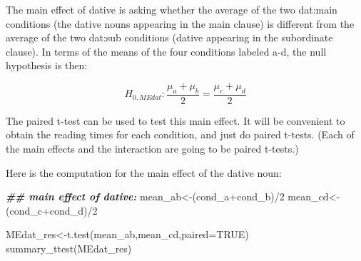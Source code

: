 \documentclass[
  12pt,
]{krantz}
\newenvironment{Shaded}{\begin{snugshade}}{\end{snugshade}}
\newcommand{\AttributeTok}[1]{\textcolor[rgb]{0.77,0.63,0.00}{#1}}
\newcommand{\ConstantTok}[1]{\textcolor[rgb]{0.00,0.00,0.00}{#1}}
\newcommand{\DecValTok}[1]{\textcolor[rgb]{0.00,0.00,0.81}{#1}}
\newcommand{\DocumentationTok}[1]{\textcolor[rgb]{0.56,0.35,0.01}{\textbf{\textit{#1}}}}
\newcommand{\FunctionTok}[1]{\textcolor[rgb]{0.00,0.00,0.00}{#1}}
\newcommand{\NormalTok}[1]{#1}
\newcommand{\OtherTok}[1]{\textcolor[rgb]{0.56,0.35,0.01}{#1}}
\newcommand{\SpecialCharTok}[1]{\textcolor[rgb]{0.00,0.00,0.00}{#1}}
\newcommand{\StringTok}[1]{\textcolor[rgb]{0.31,0.60,0.02}{#1}}
\theoremstyle{definition}
\theoremstyle{definition}
\theoremstyle{definition}
\theoremstyle{definition}
\theoremstyle{remark}
\begin{document}
The main effect of dative is asking whether the average of the two dat:main conditions (the dative nouns appearing in the main clause) is different from the average of the two dat:sub conditions (dative appearing in the subordinate clause). In terms of the means of the four conditions labeled a-d, the null hypothesis is then:

\begin{equation}
H_{0,MEdat}: \frac{\mu_a + \mu_b}{2} = \frac{\mu_c + \mu_d}{2}
\end{equation}

The paired t-test can be used to test this main effect. It will be convenient to obtain the reading times for each condition, and just do paired t-tests. (Each of the main effects and the interaction are going to be paired t-tests.)

\begin{Shaded}
\end{Shaded}

Here is the computation for the main effect of the dative noun:

\begin{Shaded}
\begin{Highlighting}[]
\DocumentationTok{\#\# main effect of dative:}
\NormalTok{mean\_ab}\OtherTok{\textless{}{-}}\NormalTok{(cond\_a}\SpecialCharTok{+}\NormalTok{cond\_b)}\SpecialCharTok{/}\DecValTok{2}
\NormalTok{mean\_cd}\OtherTok{\textless{}{-}}\NormalTok{(cond\_c}\SpecialCharTok{+}\NormalTok{cond\_d)}\SpecialCharTok{/}\DecValTok{2}

\NormalTok{MEdat\_res}\OtherTok{\textless{}{-}}\FunctionTok{t.test}\NormalTok{(mean\_ab,mean\_cd,}\AttributeTok{paired=}\ConstantTok{TRUE}\NormalTok{)}
\FunctionTok{summary\_ttest}\NormalTok{(MEdat\_res)}
\end{Highlighting}
\end{Shaded}
\end{document}
